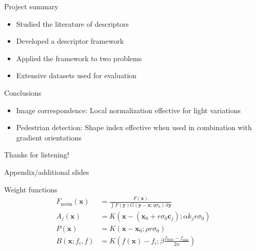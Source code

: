 \documentclass[14pt,t]{beamer}
\def\x{\mathbf{x}}
\def\y{\mathbf{y}}
\def\c{\mathbf{c}}
\begin{document}
%
\begin{frame}[c]{Project summary}
\begin{itemize}
	\item Studied the literature of descriptors
	\vspace{0.8cm}
	\item Developed a descriptor framework
	\vspace{0.8cm}
	\item Applied the framework to two problems
	\vspace{0.8cm}
	\item Extensive datasets used for evaluation
\end{itemize}
\end{frame}
%
\begin{frame}[c]{Conclusions}
\begin{itemize}
\item Image correspondence: Local normalization effective for light variations
\vspace{1cm}
\item Pedestrian detection: Shape index effective when used in combination with gradient orientations
\end{itemize}
\end{frame}
%
\begin{frame}[c]
\begin{center}
\begin{huge}
Thanks for listening!
\end{huge}
\end{center}
\end{frame}
%
\appendix
\begin{frame}{Appendix/additional slides}
\end{frame}
\begin{frame}{Weight functions}
\ghostframe
\setlength{\jot}{15pt}
\begin{align*}
F_\text{norm}(\x) &= \frac{F(\x)}{\int F(\y) G(\y - \x; \eta \sigma_0) \,\text{d} \y} \\
A_j(\x) &= K(\x - (\x_0 + r \sigma_0 \c_j); \alpha k_j r \sigma_0) \\
P(\x) &= K(\x - \x_0; \rho r \sigma_0) \\
B(\x; f_i, f) &= K \left( f(\x) - f_i; \beta \frac{f_\text{max} - f_\text{min}}{2n} \right)
\end{align*}
\end{frame}
%
\end{document}
